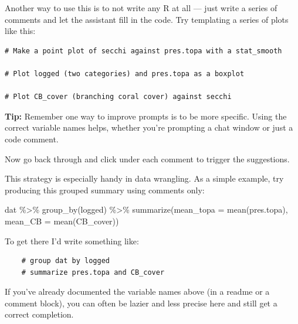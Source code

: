 \documentclass[
  letterpaper,
  DIV=11,
  numbers=noendperiod]{scrreprt}
\newenvironment{Shaded}{\begin{snugshade}}{\end{snugshade}}
\newcommand{\AttributeTok}[1]{\textcolor[rgb]{0.40,0.45,0.13}{#1}}
\newcommand{\FunctionTok}[1]{\textcolor[rgb]{0.28,0.35,0.67}{#1}}
\newcommand{\NormalTok}[1]{\textcolor[rgb]{0.00,0.23,0.31}{#1}}
\newcommand{\SpecialCharTok}[1]{\textcolor[rgb]{0.37,0.37,0.37}{#1}}
\begin{document}
Another way to use this is to not write any R at all --- just write a
series of comments and let the assistant fill in the code. Try
templating a series of plots like this:

\begin{verbatim}
# Make a point plot of secchi against pres.topa with a stat_smooth

# Plot logged (two categories) and pres.topa as a boxplot

# Plot CB_cover (branching coral cover) against secchi
\end{verbatim}

\textbf{Tip:} Remember one way to improve prompts is to be more
specific. Using the correct variable names helps, whether you're
prompting a chat window or just a code comment.

Now go back through and click under each comment to trigger the
suggestions.

This strategy is especially handy in data wrangling. As a simple
example, try producing this grouped summary using comments only:

\begin{Shaded}
\begin{Highlighting}[]
\NormalTok{dat }\SpecialCharTok{\%\textgreater{}\%}
    \FunctionTok{group\_by}\NormalTok{(logged) }\SpecialCharTok{\%\textgreater{}\%}
    \FunctionTok{summarize}\NormalTok{(}\AttributeTok{mean\_topa =} \FunctionTok{mean}\NormalTok{(pres.topa),}
                \AttributeTok{mean\_CB =} \FunctionTok{mean}\NormalTok{(CB\_cover))}
\end{Highlighting}
\end{Shaded}

To get there I'd write something like:

\begin{verbatim}
    # group dat by logged
    # summarize pres.topa and CB_cover
\end{verbatim}

If you've already documented the variable names above (in a readme or a
comment block), you can often be lazier and less precise here and still
get a correct completion.
\end{document}
